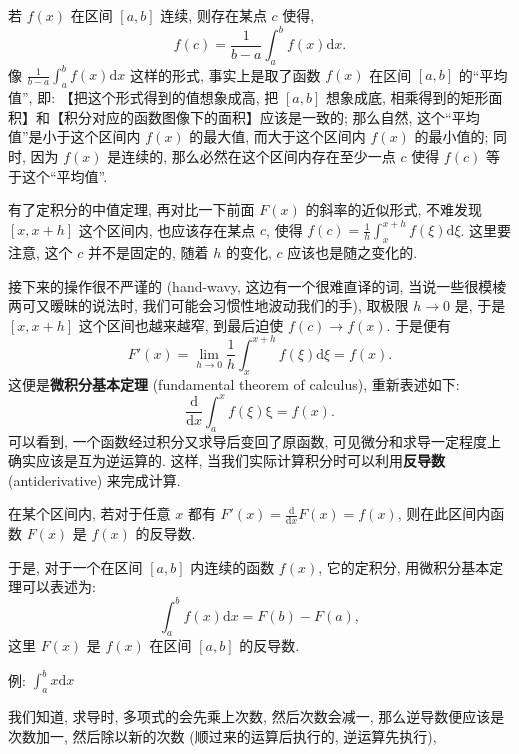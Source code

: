 \begin{tcolorbox}[size=fbox, breakable, enhanced jigsaw, title={微积分基本定理 (fundamental theorem of calculus)}]
\begin{tcolorbox}[size=fbox, breakable, enhanced jigsaw, title={插曲: 定积分的中值定理}]
若 \(f(x)\) 在区间 \([a,b]\) 连续, 则存在某点 \(c\) 使得, \[
\boxed{f(c)=\frac{1}{b-a}\int^b_af(x)\mathrm{d}x.}
\] 像 \(\frac{1}{b-a}\int_a^bf(x)\mathrm{d}x\) 这样的形式,
事实上是取了函数 \(f(x)\) 在区间 \([a,b]\) 的``平均值'', 即:
【把这个形式得到的值想象成高, 把 \([a,b]\) 想象成底,
相乘得到的矩形面积】和【积分对应的函数图像下的面积】应该是一致的;
那么自然, 这个``平均值''是小于这个区间内 \(f(x)\) 的最大值,
而大于这个区间内 \(f(x)\) 的最小值的; 同时, 因为 \(f(x)\) 是连续的,
那么必然在这个区间内存在至少一点 \(c\) 使得 \(f(c)\) 等于这个``平均值''.

\end{tcolorbox}

有了定积分的中值定理, 再对比一下前面 \(F(x)\) 的斜率的近似形式, 不难发现
\([x,x+h]\) 这个区间内, 也应该存在某点 \(c\), 使得
\(f(c)=\frac{1}{h}\int_x^{x+h}f(\xi)\mathrm{d}\xi\). 这里要注意, 这个
\(c\) 并不是固定的, 随着 \(h\) 的变化, \(c\) 应该也是随之变化的.

接下来的操作很不严谨的 (hand-wavy, 这边有一个很难直译的词,
当说一些很模棱两可又暧昧的说法时, 我们可能会习惯性地波动我们的手),
取极限 \(h\rightarrow0\) 是, 于是 \([x,x+h]\) 这个区间也越来越窄,
到最后迫使 \(f(c)\rightarrow f(x)\). 于是便有 \[
F'(x)=\lim_{h\rightarrow 0}\frac{1}{h}\int_x^{x+h}f(\xi)\mathrm{d}\xi=f(x).
\] 这便是\textbf{微积分基本定理} (fundamental theorem of calculus),
重新表述如下: \[
\boxed{\frac{\mathrm{d}}{\mathrm{d}x}\int_a^xf(\xi)\mathrm{\xi}=f(x).}
\] 可以看到, 一个函数经过积分又求导后变回了原函数,
可见微分和求导一定程度上确实应该是互为逆运算的. 这样,
当我们实际计算积分时可以利用\textbf{反导数 }(antiderivative) 来完成计算.

\begin{tcolorbox}[size=fbox, breakable, enhanced jigsaw, title={反导数}]

在某个区间内, 若对于任意 \(x\) 都有
\(F'(x)=\frac{\mathrm{d}}{\mathrm{d}x}F(x)=f(x)\), 则在此区间内函数
\(F(x)\) 是 \(f(x)\) 的反导数.

于是, 对于一个在区间 \([a,b]\) 内连续的函数 \(f(x)\), 它的定积分,
用微积分基本定理可以表述为: \[
\boxed{\int_a^bf(x)\mathrm{d}x=F(b)-F(a),}
\] 这里 \(F(x)\) 是 \(f(x)\) 在区间 \([a,b]\) 的反导数.

\end{tcolorbox}

\begin{newquote}
例: \(\int_a^b x\mathrm{d}x\)

我们知道, 求导时, 多项式的会先乘上次数, 然后次数会减一,
那么逆导数便应该是次数加一, 然后除以新的次数 (顺过来的运算后执行的,
逆运算先执行),


\end{newquote}
\end{tcolorbox}
